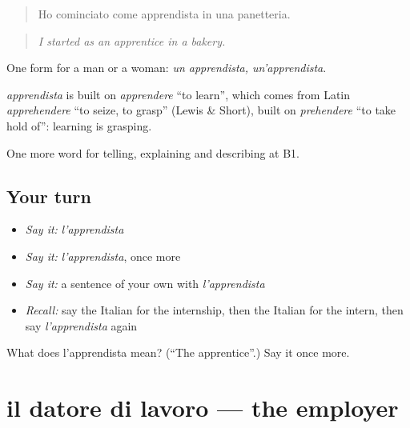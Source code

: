 \begin{quote}
Ho cominciato come apprendista in una panetteria.
\end{quote}

\begin{quote}
\emph{I started as an apprentice in a bakery.}
\end{quote}

One form for a man or a woman: \emph{un apprendista, un'apprendista}.

\begin{cousinweb}
\emph{apprendista} is built on \emph{apprendere} \textquotedblleft{}to learn\textquotedblright{}, which comes from Latin \emph{apprehendere} \textquotedblleft{}to seize, to grasp\textquotedblright{} (Lewis \& Short), built on \emph{prehendere} \textquotedblleft{}to take hold of\textquotedblright{}: learning is grasping.
\end{cousinweb}

\begin{grammarlens}[title={What you've built}]
One more word for telling, explaining and describing at B1.
\end{grammarlens}

\subsection*{Your turn}
\begin{itemize}
\raggedright
  \item \emph{Say it:} \emph{l'apprendista}
  \item \emph{Say it:} \emph{l'apprendista}, once more
  \item \emph{Say it:} a sentence of your own with \emph{l'apprendista}
  \item \emph{Recall:} say the Italian for the internship, then the Italian for the intern, then say \emph{l'apprendista} again
\end{itemize}

\begin{tcolorbox}[breakable,colback=teal!4,colframe=teal!35!black,title={Before you move on}]
What does l'apprendista mean? (\textquotedblleft{}The apprentice\textquotedblright{}.) Say it once more.
\end{tcolorbox}
\section[il datore di lavoro]{il datore di lavoro — the employer}

\label{lesson:IT-C358-datore-di-lavoro}




